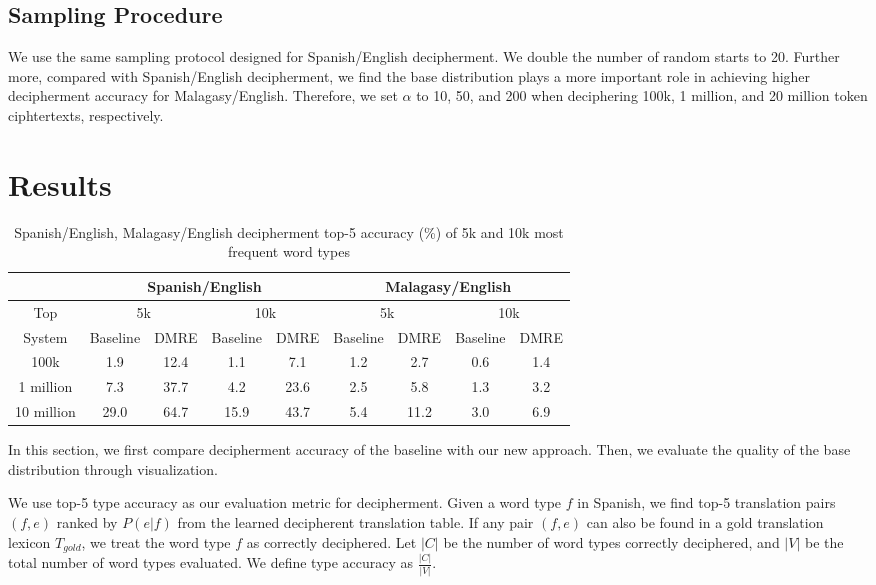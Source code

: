 \subsection{Sampling Procedure}

We use the same sampling protocol designed for Spanish/English decipherment. We double the number of random starts to 20. Further more, compared with Spanish/English decipherment, we find the base distribution plays a more important role in achieving higher decipherment accuracy for Malagasy/English. Therefore, we set $\alpha$ to 10, 50, and 200 when deciphering 100k, 1 million, and 20 million token ciphtertexts, respectively.


\section{Results}

%
 \begin{table}[!ht]
 \begin{center}
 \begin{tabular}{ |c|c|c|c|c|c|c|c|c| } \hline
         & \multicolumn{4}{|c|}{Spanish/English} & \multicolumn{4}{|c|}{Malagasy/English} \\ \hline
 Top &  \multicolumn{2}{|c|}{5k} & \multicolumn{2}{|c|}{10k} & \multicolumn{2}{|c|}{5k} & \multicolumn{2}{|c|}{10k} \\ \hline
 System &  Baseline & DMRE & Baseline & DMRE &  Baseline & DMRE & Baseline & DMRE \\ \hline
 100k &  1.9 & 12.4 & 1.1 & 7.1 &  1.2 & 2.7 & 0.6 & 1.4 \\ \hline
 1 million &  7.3 & 37.7& 4.2 & 23.6 &  2.5 & 5.8 & 1.3 & 3.2 \\ \hline
 10 million &  29.0 & 64.7 & 15.9 & 43.7 &  5.4 & 11.2 & 3.0 & 6.9 \\ \hline
 \end{tabular}
 \caption{Spanish/English, Malagasy/English decipherment top-5 accuracy (\%) of 5k and 10k most frequent word types}
 \label{decipher-acc-result}
 \end{center}
 \end{table}
%

In this section, we first compare decipherment accuracy of the baseline with our new approach. Then, we evaluate the quality of the base distribution through visualization.

We use top-5 type accuracy as our evaluation metric for decipherment. Given a word type $f$ in Spanish, we find top-5 translation pairs $(f,e)$ ranked by $P(e|f)$ from the learned decipherent translation table. If any pair $(f,e)$ can also be found in a gold translation lexicon $T_{gold}$, we treat the word type $f$ as correctly deciphered. Let $|C|$ be the number of word types correctly deciphered, and $|V|$ be the total number of word types evaluated. We define type accuracy as $\frac{|C|}{|V|}$.


